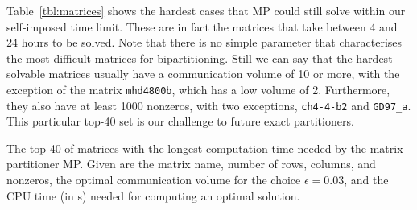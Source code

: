 Table~\ref{tbl:matrices} shows the hardest cases that MP could still
solve within our self-imposed time limit.
These are in fact the matrices that take between 4 and 24 hours to be solved.
Note that there is no simple parameter that characterises the most difficult  matrices
for bipartitioning. Still we can say 
that the hardest solvable matrices usually have a communication volume of 10 or more,
with the exception
of the matrix \texttt{mhd4800b}, which has a low volume of 2.
Furthermore, they also have at least 1000 nonzeros, with two exceptions, \texttt{ch4-4-b2}
and \texttt{GD97\_a}. This particular top-40 set is our challenge to future exact partitioners.


\begin{table*}[p]
\caption{The top-40 of matrices with the longest computation time needed by
the matrix partitioner MP. Given are the matrix name, number of rows, columns, and nonzeros,
the optimal communication volume for the choice $\epsilon=0.03$,
and the CPU time (in s) needed for computing 
an optimal solution.}
\label{tbl:matrices}


\end{table*}

